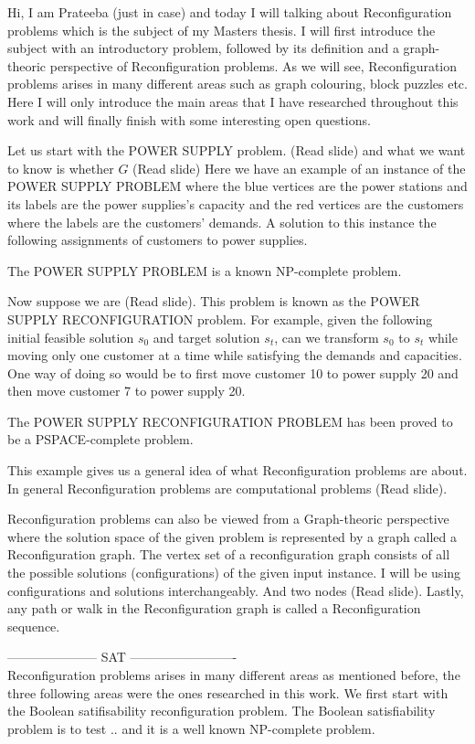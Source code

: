 Hi, I am Prateeba (just in case) and today I will talking about Reconfiguration problems which is the subject of my Masters thesis. I will first introduce the subject with an introductory problem, followed by its definition and a graph-theoric perspective of Reconfiguration problems. 
As we will see, Reconfiguration problems arises in many different areas such as graph colouring, block puzzles etc. Here I will only introduce the main areas that I have researched throughout this work and will finally finish with some interesting open questions. 

Let us start with the POWER SUPPLY problem. 
(Read slide) and what we want to know is whether $G$ (Read slide)
Here we have an example of an instance of the POWER SUPPLY PROBLEM where the blue vertices are the power stations and its labels are the power supplies's capacity and the red vertices are the customers where the labels are the customers' demands. 
A solution to this instance the following assignments of customers to power supplies. 

The POWER SUPPLY PROBLEM is a known NP-complete problem. 

Now suppose we are (Read slide). This problem is known as the POWER SUPPLY RECONFIGURATION problem. 
For example, given the following initial feasible solution $s_0$ and target solution $s_t$, can we transform $s_0$ to $s_t$ while moving only one customer at a time while satisfying the demands and capacities. One way of doing so would be to first move customer 10 to power supply 20 and then move customer 7 to power supply 20.

The POWER SUPPLY RECONFIGURATION PROBLEM has been proved to be a PSPACE-complete problem.  

This example gives us a general idea of what Reconfiguration problems are about. In general Reconfiguration problems are computational problems (Read slide). 

Reconfiguration problems can also be viewed from a Graph-theoric perspective where the solution space of the given problem is represented by a graph called a Reconfiguration graph. The vertex set of a reconfiguration graph consists of all the possible solutions (configurations) of the given input instance. I will be 
using configurations and solutions interchangeably. And two nodes (Read slide). 
Lastly, any path or walk in the Reconfiguration graph is called a Reconfiguration sequence. 

--------------------- SAT ------------------------- \\ 
Reconfiguration problems arises in many different areas as mentioned before, the three following areas were the ones researched in this work. We first start with the Boolean satifisability reconfiguration problem. The Boolean satisfiability problem is to test .. 
and it is a well known NP-complete problem. 

